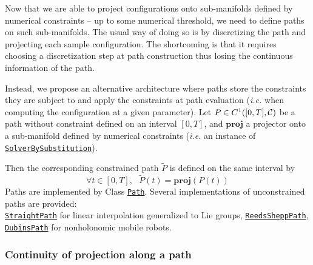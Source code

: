 Now that we are able to project configurations onto sub-manifolds defined by numerical constraints -- up to some numerical threshold, we need to define paths on such sub-manifolds. The usual way of doing so is by discretizing the path and projecting each sample configuration. The shortcoming is that it requires choosing a discretization step at path construction thus losing the continuous information of the path.

Instead, we propose an alternative architecture where paths store the constraints they are subject to and apply the constraints at path evaluation {\color{blue}(\textit{i.e.} when computing the configuration at a given parameter)}. Let $P\in C^1([0,T],\mathcal{C})$ be a path without constraint defined on an interval $[0,T]$, and $\mathbf{proj}$ a projector onto a sub-manifold defined by numerical constraints (\textit{i.e.} an instance of\\ \href{https://gepettoweb.laas.fr/hpp/hpp-constraints/doxygen-html/classhpp_1_1constraints_1_1solver_1_1BySubstitution.html}{\texttt{SolverBySubstitution}}).

Then the corresponding constrained path $\tilde{P}$ is defined on the same interval by
$$
\forall t\in[0,T],\ \ \ \tilde{P}(t) = \mathbf{proj}(P(t))
$$
Paths are implemented by Class \href{https://gepettoweb.laas.fr/hpp/hpp-core/doxygen-html/classhpp_1_1core_1_1Path.html}{\texttt{Path}}. Several implementations of unconstrained paths are provided:\\
\href{https://gepettoweb.laas.fr/hpp/hpp-core/doxygen-html/classhpp_1_1core_1_1StraightPath.html}{\texttt{StraightPath}} for linear interpolation generalized to Lie groups, \href{https://gepettoweb.laas.fr/hpp/hpp-core/doxygen-html/classhpp_1_1core_1_1ReedsSheppPath.html}{\texttt{ReedsSheppPath}}, \href{https://gepettoweb.laas.fr/hpp/hpp-core/doxygen-html/classhpp_1_1core_1_1DubinsPath.html}{\texttt{DubinsPath}} for non\-holo\-nomic mobile robots.

\subsubsection{Continuity of projection along a path}

